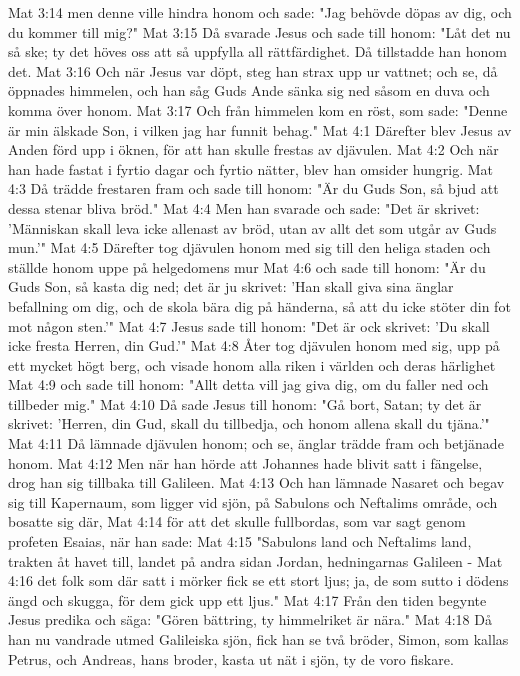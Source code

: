 Mat 3:14  men denne ville hindra honom och sade: "Jag behövde döpas av dig, och du kommer till mig?"
Mat 3:15  Då svarade Jesus och sade till honom: "Låt det nu så ske; ty det höves oss att så uppfylla all rättfärdighet. Då tillstadde han honom det.
Mat 3:16  Och när Jesus var döpt, steg han strax upp ur vattnet; och se, då öppnades himmelen, och han såg Guds Ande sänka sig ned såsom en duva och komma över honom.
Mat 3:17  Och från himmelen kom en röst, som sade: "Denne är min älskade Son, i vilken jag har funnit behag."
Mat 4:1  Därefter blev Jesus av Anden förd upp i öknen, för att han skulle frestas av djävulen.
Mat 4:2  Och när han hade fastat i fyrtio dagar och fyrtio nätter, blev han omsider hungrig.
Mat 4:3  Då trädde frestaren fram och sade till honom: "Är du Guds Son, så bjud att dessa stenar bliva bröd."
Mat 4:4  Men han svarade och sade: "Det är skrivet: 'Människan skall leva icke allenast av bröd, utan av allt det som utgår av Guds mun.'"
Mat 4:5  Därefter tog djävulen honom med sig till den heliga staden och ställde honom uppe på helgedomens mur
Mat 4:6  och sade till honom: "Är du Guds Son, så kasta dig ned; det är ju skrivet: 'Han skall giva sina änglar befallning om dig, och de skola bära dig på händerna, så att du icke stöter din fot mot någon sten.'"
Mat 4:7  Jesus sade till honom: "Det är ock skrivet: 'Du skall icke fresta Herren, din Gud.'"
Mat 4:8  Åter tog djävulen honom med sig, upp på ett mycket högt berg, och visade honom alla riken i världen och deras härlighet
Mat 4:9  och sade till honom: "Allt detta vill jag giva dig, om du faller ned och tillbeder mig."
Mat 4:10  Då sade Jesus till honom: "Gå bort, Satan; ty det är skrivet: 'Herren, din Gud, skall du tillbedja, och honom allena skall du tjäna.'"
Mat 4:11  Då lämnade djävulen honom; och se, änglar trädde fram och betjänade honom.
Mat 4:12  Men när han hörde att Johannes hade blivit satt i fängelse, drog han sig tillbaka till Galileen.
Mat 4:13  Och han lämnade Nasaret och begav sig till Kapernaum, som ligger vid sjön, på Sabulons och Neftalims område, och bosatte sig där,
Mat 4:14  för att det skulle fullbordas, som var sagt genom profeten Esaias, när han sade:
Mat 4:15  "Sabulons land och Neftalims land, trakten åt havet till, landet på andra sidan Jordan, hedningarnas Galileen -
Mat 4:16  det folk som där satt i mörker fick se ett stort ljus; ja, de som sutto i dödens ängd och skugga, för dem gick upp ett ljus."
Mat 4:17  Från den tiden begynte Jesus predika och säga: "Gören bättring, ty himmelriket är nära."
Mat 4:18  Då han nu vandrade utmed Galileiska sjön, fick han se två bröder, Simon, som kallas Petrus, och Andreas, hans broder, kasta ut nät i sjön, ty de voro fiskare.
